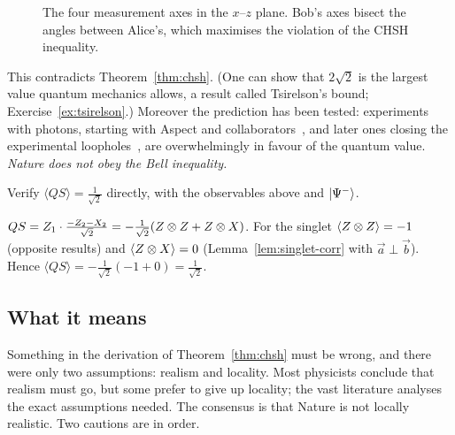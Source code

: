 \begin{figure}[htb]
  \centering
  \caption{The four measurement axes in the $x$--$z$ plane. Bob's axes bisect the angles between Alice's, which maximises the violation of the CHSH inequality.}
  \label{fig:bell-axes}
\end{figure}

This contradicts Theorem~\ref{thm:chsh}. (One can show that $2\sqrt2$ is the largest value quantum mechanics allows, a result called Tsirelson's bound; Exercise~\ref{ex:tsirelson}.) Moreover the prediction has been tested: experiments with photons, starting with Aspect and collaborators~\cite{aspect1982}, and later ones
closing the experimental loopholes~\cite{hensen2015}, are overwhelmingly in favour of the quantum value. \emph{Nature does not obey the Bell inequality.}

\begin{example}\label{ex:chsh-numeric}
  Verify $\langle QS\rangle=\tfrac1{\sqrt2}$ directly, with the observables above and $\left|\Psi^-\right\rangle$.
\end{example}
\begin{solution}
  $QS=Z_1\cdot\frac{-Z_2-X_2}{\sqrt2}=-\tfrac1{\sqrt2}(Z\otimes Z+Z\otimes X)$. For the singlet $\langle Z\otimes Z\rangle=-1$ (opposite results) and $\langle Z\otimes X\rangle=0$ (Lemma~\ref{lem:singlet-corr} with $\vec a\perp\vec b$). Hence $\langle QS\rangle=-\tfrac1{\sqrt2}(-1+0)=\tfrac1{\sqrt2}$.
\end{solution}

\subsection{What it means}

Something in the derivation of Theorem~\ref{thm:chsh} must be wrong, and there were only two assumptions: realism and locality. Most physicists conclude that realism must go, but some prefer to give up locality; the vast literature
analyses the exact assumptions needed. The consensus is that Nature is not locally realistic. Two cautions are in order.

